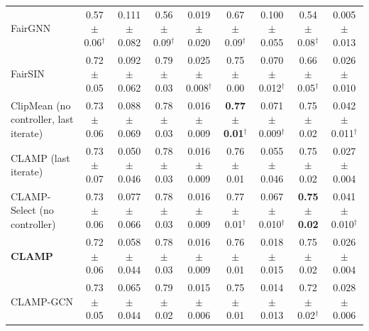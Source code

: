 \begin{table}[tbp]
{\begin{tabular}{p{2.4cm} cc cc cc cc}
\raggedright FairGNN & 0.57$\pm$0.06$^\dagger$ & 0.111$\pm$0.082 & 0.56$\pm$0.09$^\dagger$ & 0.019$\pm$0.020 & 0.67$\pm$0.09$^\dagger$ & 0.100$\pm$0.055 & 0.54$\pm$0.08$^\dagger$ & 0.005$\pm$0.013 \\
\raggedright FairSIN & 0.72$\pm$0.05 & 0.092$\pm$0.062 & 0.79$\pm$0.03 & 0.025$\pm$0.008$^\dagger$ & 0.75$\pm$0.00 & 0.070$\pm$0.012$^\dagger$ & 0.66$\pm$0.05$^\dagger$ & 0.026$\pm$0.010 \\
\raggedright ClipMean (no controller, last iterate) & 0.73$\pm$0.06 & 0.088$\pm$0.069 & 0.78$\pm$0.03 & 0.016$\pm$0.009 & \textbf{0.77$\pm$0.01}$^\dagger$ & 0.071$\pm$0.009$^\dagger$ & 0.75$\pm$0.02 & 0.042$\pm$0.011$^\dagger$ \\
\raggedright CLAMP (last iterate) & 0.73$\pm$0.07 & 0.050$\pm$0.046 & 0.78$\pm$0.03 & 0.016$\pm$0.009 & 0.76$\pm$0.01 & 0.055$\pm$0.046 & 0.75$\pm$0.02 & 0.027$\pm$0.004 \\
\raggedright CLAMP-Select (no controller) & 0.73$\pm$0.06 & 0.077$\pm$0.066 & 0.78$\pm$0.03 & 0.016$\pm$0.009 & 0.77$\pm$0.01$^\dagger$ & 0.067$\pm$0.010$^\dagger$ & \textbf{0.75$\pm$0.02} & 0.041$\pm$0.010$^\dagger$ \\
\raggedright \textbf{CLAMP} & 0.72$\pm$0.06 & 0.058$\pm$0.044 & 0.78$\pm$0.03 & 0.016$\pm$0.009 & 0.76$\pm$0.01 & 0.018$\pm$0.015 & 0.75$\pm$0.02 & 0.026$\pm$0.004 \\
\raggedright CLAMP-GCN & 0.73$\pm$0.05 & 0.065$\pm$0.044 & 0.79$\pm$0.02 & 0.015$\pm$0.006 & 0.75$\pm$0.01 & 0.014$\pm$0.013 & 0.72$\pm$0.02$^\dagger$ & 0.028$\pm$0.006 \\
\bottomrule
\end{tabular}}
\vspace{4pt}
\end{table}
